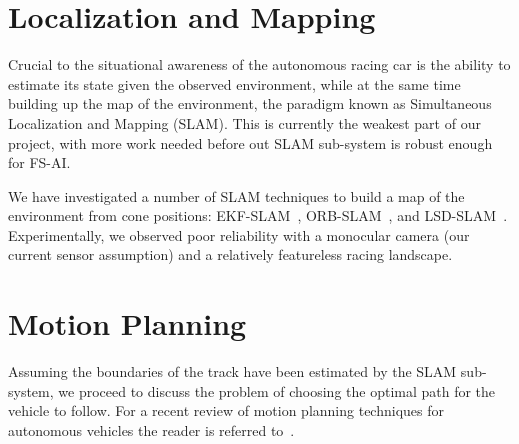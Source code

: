 \documentclass[a4paper, 10pt, conference]{ieeeconf}      %
\renewcommand{\vec}[1]{\mathbf{#1}}
\begin{document}










\section{Localization and Mapping}
Crucial to the situational awareness of the autonomous racing car is the
ability to estimate its state given the observed environment, while at the
same time building up the map of the environment, the paradigm known as
Simultaneous Localization and Mapping (SLAM). This is currently the weakest
part of our project, with more work needed before out SLAM sub-system is
robust enough for FS-AI.

We have investigated a number of SLAM techniques to build a map of the
environment from cone positions: EKF-SLAM~\cite{macsek16},
ORB-SLAM~\cite{artal15}, and LSD-SLAM~\cite{engel14}.
Experimentally, we observed poor reliability with a monocular camera (our
current sensor assumption) and a relatively featureless racing landscape.

\section{Motion Planning}
Assuming the boundaries of the track have been estimated by the SLAM
sub-system, we proceed to discuss the problem of choosing the optimal path for
the vehicle to follow. For a recent review of motion planning techniques for
autonomous vehicles the reader is referred to~\cite{paden16}.
\end{document}
